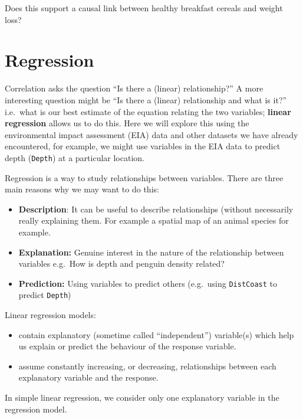 \documentclass[
  oneside]{krantz}
\providecommand{\tightlist}{%
  \setlength{\itemsep}{0pt}\setlength{\parskip}{0pt}}
\begin{document}
Does this support a causal link between healthy breakfast cereals and weight loss?

\newpage

\hypertarget{regression}{%
\section{Regression}\label{regression}}

Correlation asks the question ``Is there a (linear) relationship?'' A more interesting question might be ``Is there a (linear) relationship and what is it?'' i.e.~what is our best estimate of the equation relating the two variables; \textbf{linear regression} allows us to do this. Here we will explore this using the environmental impact assessment (EIA) data and other datasets we have already encountered, for example, we might use variables in the EIA data to predict depth (\texttt{Depth}) at a particular location.

Regression is a way to study relationships between variables. There are three main reasons why we may want to do this:

\begin{itemize}
\tightlist
\item
  \textbf{Description}: It can be useful to describe relationships (without necessarily really explaining them. For example a spatial map of an animal species for example.
\item
  \textbf{Explanation:} Genuine interest in the nature of the relationship between variables e.g.~How is depth and penguin density related?
\item
  \textbf{Prediction:} Using variables to predict others (e.g.~using \texttt{DistCoast} to predict \texttt{Depth})
\end{itemize}

Linear regression models:

\begin{itemize}
\tightlist
\item
  contain explanatory (sometime called ``independent'') variable(s) which help us explain or predict the behaviour of the response variable.
\item
  assume constantly increasing, or decreasing, relationships between each explanatory variable and the response.
\end{itemize}

In simple linear regression, we consider only one explanatory variable in the regression model.
\end{document}
